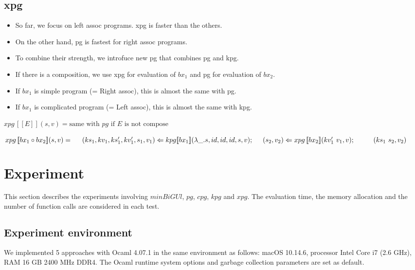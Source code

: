\documentclass[runningheads]{llncs}
\newcommand{\tab}{\hspace*{5mm}}
\newcommand{\qtab}{\hspace*{5mm} \ \quad}
\newcommand{\kpg}[7]{kpg [\![#1]\!] (#2, #3, #4, #5, #6, #7)}
\newcommand{\xpg}[3]{xpg \, [\![#1]\!] (#2, #3)}
\begin{document}



\subsection{xpg}

\begin{itemize}
\item So far, we focus on left assoc programs. xpg is faster than the others.
\item On the other hand, pg is fastest for right assoc programs.
\item To combine their strength, we introfuce new pg that combines pg and kpg.
\item If there is a composition, we use xpg for evaluation of $bx_1$ and pg for evaluation of $bx_2$.
\item If $bx_1$ is simple program (= Right assoc), this is almost the same with pg.
\item If $bx_1$ is complicated program (= Left assoc), this is almost the same with kpg.
\end{itemize}

$\xpg{E}{s}{v} = \text{same with } pg \text{ if } E \text{ is not compose}$

$\xpg{bx_1 \circ bx_2}{s}{v} =\\
    \tab (ks_1,kv_1, ks_1', kv_1', s_1, v_1) \Leftarrow \kpg{bx_1}{\lambda \_.s}{id}{id}{id}{s}{v};\\
    \tab (s_2, v_2) \Leftarrow \xpg{bx_2}{kv_1' \ v_1}{v};\\
    \qtab (ks_1 \ s_2, v_2)$

\section{Experiment}

This section describes the experiments involving $minBiGUl$, $pg$, $cpg$, $kpg$ and $xpg$. The evaluation time, the memory allocation and the number of function calls are considered in each test.

\subsection{Experiment environment}
We implemented 5 approaches with Ocaml 4.07.1 in the same environment as follows: macOS 10.14.6, processor Intel Core i7 (2.6 GHz), RAM 16 GB 2400 MHz DDR4. The Ocaml runtime system options and garbage collection parameters are set as default.  
\end{document}
